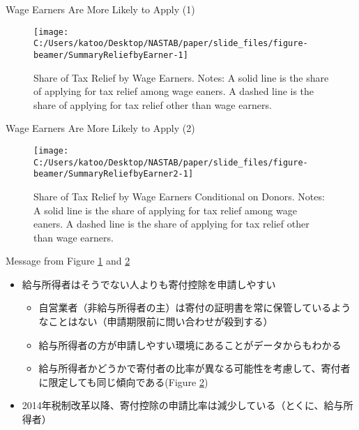\documentclass[
  ignorenonframetext,
  aspectratio=169,
]{beamer}
\providecommand{\tightlist}{%
  \setlength{\itemsep}{0pt}\setlength{\parskip}{0pt}}
\begin{document}
\begin{frame}{Wage Earners Are More Likely to Apply (1)}
\protect\hypertarget{wage-earners-are-more-likely-to-apply-1}{}
\begin{figure}[t]

{\centering \texttt{[image: C:/Users/katoo/Desktop/NASTAB/paper/slide\_files/figure-beamer/SummaryReliefbyEarner-1]} 

}

\caption{Share of Tax Relief by Wage Earners. Notes: A solid line is the share of applying for tax relief among wage eaners. A dashed line is the share of applying for tax relief other than wage earners.}\label{fig:SummaryReliefbyEarner}
\end{figure}
\end{frame}

\begin{frame}{Wage Earners Are More Likely to Apply (2)}
\protect\hypertarget{wage-earners-are-more-likely-to-apply-2}{}
\begin{figure}[t]

{\centering \texttt{[image: C:/Users/katoo/Desktop/NASTAB/paper/slide\_files/figure-beamer/SummaryReliefbyEarner2-1]} 

}

\caption{Share of Tax Relief by Wage Earners Conditional on Donors. Notes: A solid line is the share of applying for tax relief among wage eaners. A dashed line is the share of applying for tax relief other than wage earners.}\label{fig:SummaryReliefbyEarner2}
\end{figure}
\end{frame}

\begin{frame}{Message from Figure \ref{fig:SummaryReliefbyEarner} and \ref{fig:SummaryReliefbyEarner2}}
\protect\hypertarget{message-from-figure-reffigsummaryreliefbyearner-and-reffigsummaryreliefbyearner2}{}
\begin{itemize}
\tightlist
\item
  給与所得者はそうでない人よりも寄付控除を申請しやすい

  \begin{itemize}
  \tightlist
  \item
    自営業者（非給与所得者の主）は寄付の証明書を常に保管しているようなことはない（申請期限前に問い合わせが殺到する）
  \item
    給与所得者の方が申請しやすい環境にあることがデータからもわかる
  \item
    給与所得者かどうかで寄付者の比率が異なる可能性を考慮して、寄付者に限定しても同じ傾向である(Figure \ref{fig:SummaryReliefbyEarner2})
  \end{itemize}
\item
  2014年税制改革以降、寄付控除の申請比率は減少している（とくに、給与所得者）
\end{itemize}
\end{frame}
\end{document}

